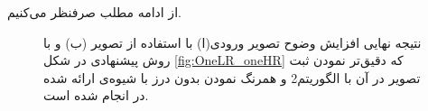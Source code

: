 \documentclass[conference]{IEEEtran-ModifiedForMVIP}
\begin{document}
از ادامه مطلب صرفنظر می‌کنیم.
\begin{figure}[tp]
\centering {}%
 \caption{نتیجه نهایی افزایش وضوح تصویر ورودی(ا) با استفاده از تصویر (ب) و با روش پیشنهادی در شکل \ref{fig:OneLR_oneHR} که دقیق‌تر نمودن ثبت تصویر در آن با الگوریتم2 و همرنگ نمودن بدون درز با شیوه‌ی ارائه شده در \cite{Burt83multiresolution} انجام شده است.}
\label{fig:Results}
\end{figure}
\end{document}
